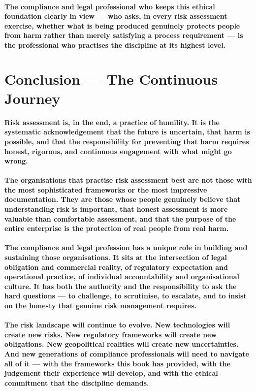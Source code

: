 \paragraph{The compliance and legal professional who keeps this ethical foundation clearly in view — who asks, in every risk assessment exercise, whether what is being produced genuinely protects people from harm rather than merely satisfying a process requirement — is the professional who practises the discipline at its highest level.}

\section{Conclusion — The Continuous Journey}
\paragraph{Risk assessment is, in the end, a practice of humility. It is the systematic acknowledgement that the future is uncertain, that harm is possible, and that the responsibility for preventing that harm requires honest, rigorous, and continuous engagement with what might go wrong.}
\paragraph{The organisations that practise risk assessment best are not those with the most sophisticated frameworks or the most impressive documentation. They are those whose people genuinely believe that understanding risk is important, that honest assessment is more valuable than comfortable assessment, and that the purpose of the entire enterprise is the protection of real people from real harm.}
\paragraph{The compliance and legal profession has a unique role in building and sustaining those organisations. It sits at the intersection of legal obligation and commercial reality, of regulatory expectation and operational practice, of individual accountability and organisational culture. It has both the authority and the responsibility to ask the hard questions — to challenge, to scrutinise, to escalate, and to insist on the honesty that genuine risk management requires.}
\paragraph{The risk landscape will continue to evolve. New technologies will create new risks. New regulatory frameworks will create new obligations. New geopolitical realities will create new uncertainties. And new generations of compliance professionals will need to navigate all of it — with the frameworks this book has provided, with the judgement their experience will develop, and with the ethical commitment that the discipline demands.}
